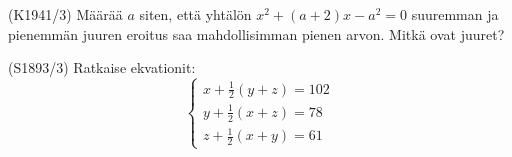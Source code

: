 \begin{tehtava}(K1941/3)
Määrää $a$ siten, että yhtälön $x^2+(a+2)x-a^2=0$ suuremman ja pienemmän juuren eroitus saa mahdollisimman pienen arvon. Mitkä ovat juuret? 
\end{tehtava}


\begin{tehtava}(S1893/3)
Ratkaise ekvationit:
\[
\left\{
\begin{aligned}
 x+\frac{1}{2}(y+z)=102    \\
 y+\frac{1}{2}(x+z)=78  \\
 z+\frac{1}{2}(x+y)=61
\end{aligned}
\right. 
\]
\end{tehtava}


